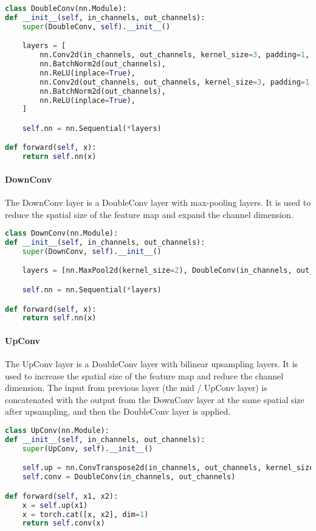 \begin{lstlisting}[language=Python, caption=models/unet.py: DoubleConv, label=lst:unet_doubleconv]
class DoubleConv(nn.Module):
def __init__(self, in_channels, out_channels):
    super(DoubleConv, self).__init__()

    layers = [
        nn.Conv2d(in_channels, out_channels, kernel_size=3, padding=1, bias=False),
        nn.BatchNorm2d(out_channels),
        nn.ReLU(inplace=True),
        nn.Conv2d(out_channels, out_channels, kernel_size=3, padding=1, bias=False),
        nn.BatchNorm2d(out_channels),
        nn.ReLU(inplace=True),
    ]

    self.nn = nn.Sequential(*layers)

def forward(self, x):
    return self.nn(x)
\end{lstlisting}

\paragraph{DownConv}
The DownConv layer is a DoubleConv layer with max-pooling layers. It is used to reduce the spatial size of the feature map and expand the channel dimension.

\begin{lstlisting}[language=Python, caption=models/unet.py: DownConv, label=lst:unet_downconv]
class DownConv(nn.Module):
def __init__(self, in_channels, out_channels):
    super(DownConv, self).__init__()

    layers = [nn.MaxPool2d(kernel_size=2), DoubleConv(in_channels, out_channels)]

    self.nn = nn.Sequential(*layers)

def forward(self, x):
    return self.nn(x)
\end{lstlisting}

\paragraph{UpConv}
The UpConv layer is a DoubleConv layer with bilinear upsampling layers. It is used to increase the spatial size of the feature map and reduce the channel dimension.
The input from previous layer (the mid / UpConv layer) is concatenated with the output from the DownConv layer at the same spatial size after upsampling, and then the DoubleConv layer is applied.
\begin{lstlisting}[language=Python, caption=models/unet.py: UpConv, label=lst:unet_upconv]
class UpConv(nn.Module):
def __init__(self, in_channels, out_channels):
    super(UpConv, self).__init__()

    self.up = nn.ConvTranspose2d(in_channels, out_channels, kernel_size=2, stride=2)
    self.conv = DoubleConv(in_channels, out_channels)

def forward(self, x1, x2):
    x = self.up(x1)
    x = torch.cat([x, x2], dim=1)
    return self.conv(x)
\end{lstlisting}


